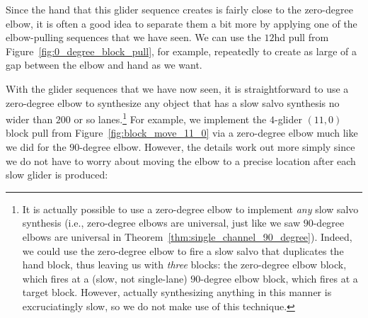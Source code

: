 Since the hand that this glider sequence creates is fairly close to the zero-degree elbow, it is often a good idea to separate them a bit more by applying one of the elbow-pulling sequences that we have seen. We can use the $12$hd pull from Figure~\ref{fig:0_degree_block_pull}, for example, repeatedly to create as large of a gap between the elbow and hand as we want.

With the glider sequences that we have now seen, it is straightforward to use a zero-degree elbow to synthesize any object that has a slow salvo synthesis no wider than $200$ or so lanes.\footnote{It is actually possible to use a zero-degree elbow to implement \emph{any} slow salvo synthesis (i.e., zero-degree elbows are universal, just like we saw $90$-degree elbows are universal in Theorem~\ref{thm:single_channel_90_degree}). Indeed, we could use the zero-degree elbow to fire a slow salvo that duplicates the hand block, thus leaving us with \emph{three} blocks: the zero-degree elbow block, which fires at a (slow, not single-lane) $90$-degree elbow block, which fires at a target block. However, actually synthesizing anything in this manner is excruciatingly slow, so we do not make use of this technique.} For example, we implement the $4$-glider $(11,0)$ block pull from Figure~\ref{fig:block_move_11_0} via a zero-degree elbow much like we did for the $90$-degree elbow. However, the details work out more simply since we do not have to worry about moving the elbow to a precise location after each slow glider is produced:\smallskip


